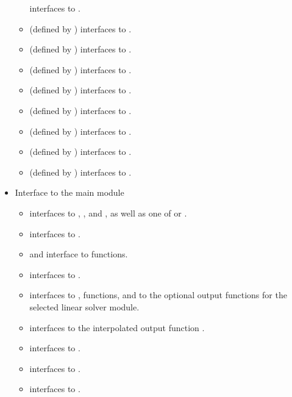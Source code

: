 \begin{itemize}
\begin{itemize}
    interfaces to .
  \item {} (defined by {\sunlinsollapband}) 
    interfaces to .
  \item {} (defined by {\sunlinsollapdense}) 
    interfaces to .
  \item {} (defined by {\sunlinsolpcg}) 
    interfaces to .
  \item {} (defined by {\sunlinsolspbcgs}) 
    interfaces to .
  \item {} (defined by {\sunlinsolspfgmr}) 
    interfaces to .
  \item {} (defined by {\sunlinsolspgmr}) 
    interfaces to .
  \item {} (defined by {\sunlinsolsptfqmr}) 
    interfaces to .
  \item {} (defined by {\sunlinsolslumt}) 
    interfaces to .
  \end{itemize}
\item Interface to the main {\cvode} module
  \begin{itemize}
  \item {}
    interfaces to , , and ,
    as well as one of  or .
  \item {}  
    interfaces to .
  \item {} and 
    interface to  functions.
  \item {}    
    interfaces to .
  \item {}
    interfaces to ,  functions, and to the optional
    output functions for the selected linear solver module.
  \item {}     
    interfaces to the interpolated output function .
  \item {}
    interfaces to .
  \item {}
    interfaces to .
  \item {}    
    interfaces to .

\end{itemize}
\end{itemize}
